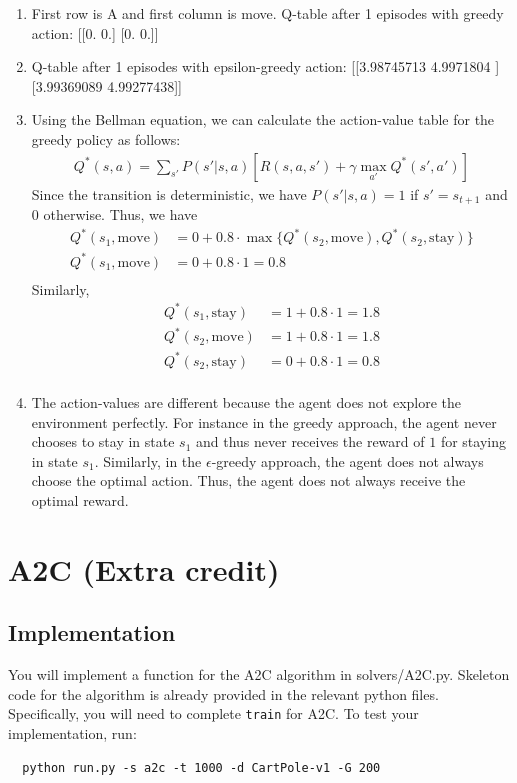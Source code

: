 \documentclass[a4paper]{article}
\theoremstyle{definition}
\begin{document}
\begin{enumerate}
\begin{enumerate}
    \item First row is A and first column is move.  
    Q-table after 1 episodes with greedy action:
    [[0. 0.]
     [0. 0.]]
    \item Q-table after 1 episodes with epsilon-greedy action:
    [[3.98745713 4.9971804 ]
     [3.99369089 4.99277438]]
    \item Using the Bellman equation, we can calculate the action-value table for the greedy policy as follows:
    \begin{align*}
        Q^*(s, a) = \sum_{s'} P(s' | s, a) \left[ R(s, a, s') + \gamma \max_{a'} Q^*(s', a') \right]
    \end{align*}
    Since the transition is deterministic, we have $P(s' | s, a) = 1$ if $s' = s_{t+1}$ and $0$ otherwise. Thus, we have
    \begin{align*}
        Q^*(s_1, \text{move}) &= 0 + 0.8 \cdot \max \{ Q^*(s_2, \text{move}), Q^*(s_2, \text{stay}) \} \\
        Q^*(s_1, \text{move}) &= 0 + 0.8 \cdot 1  = 0.8 \\
    \end{align*}
    Similarly, 
    \begin{align*}
        Q^*(s_1, \text{stay}) &= 1 + 0.8 \cdot 1 = 1.8 \\
        Q^*(s_2, \text{move}) &= 1 + 0.8 \cdot 1 = 1.8 \\
        Q^*(s_2, \text{stay}) &= 0 + 0.8 \cdot 1 = 0.8 \\
    \end{align*}
    \item The action-values are different because the agent does not explore the environment perfectly. For instance in the greedy approach, the agent never chooses to stay in state $s_1$ and thus never receives the reward of $1$ for staying in state $s_1$. Similarly, in the $\epsilon$-greedy approach, the agent does not always choose the optimal action. Thus, the agent does not always receive the optimal reward.
\end{enumerate}
\section{A2C (Extra credit)}
\subsection{Implementation}

You will implement a function for the A2C algorithm in solvers/A2C.py.
% 
Skeleton code for the algorithm is already provided in the relevant python files.
% 
Specifically, you will need to complete \verb|train| for A2C.
% 
To test your implementation, run:
% 
\begin{verbatim}
  python run.py -s a2c -t 1000 -d CartPole-v1 -G 200 
  

\end{verbatim}
\end{enumerate}
\end{document}
